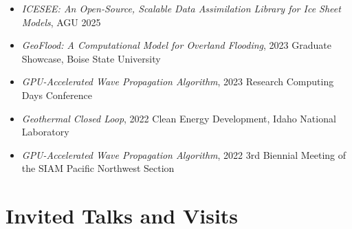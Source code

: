 \documentclass[11pt]{article}
\begin{document}
\begin{itemize}[leftmargin=1.2em, itemsep=2pt, topsep=2pt]

\item \textit{ICESEE: An Open-Source, Scalable Data Assimilation Library for Ice Sheet Models}, AGU 2025

\item \textit{GeoFlood: A Computational Model for Overland Flooding}, 2023 Graduate Showcase, Boise State University

\item \textit{GPU-Accelerated Wave Propagation Algorithm}, 2023 Research Computing Days Conference

\item \textit{Geothermal Closed Loop}, 2022 Clean Energy Development, Idaho National Laboratory

\item \textit{GPU-Accelerated Wave Propagation Algorithm}, 2022 3rd Biennial Meeting of the SIAM Pacific Northwest Section

\end{itemize}

\section*{Invited Talks and Visits}
\end{document}
